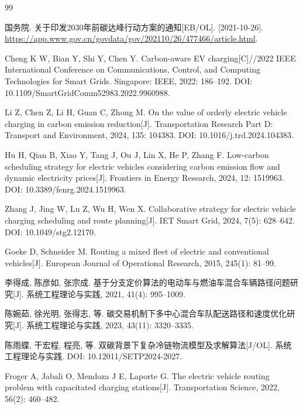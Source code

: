 \documentclass{setp-new}
\begin{document}

\begin{thebibliography}{99}

 国务院. 关于印发2030年前碳达峰行动方案的通知[EB/OL]. [2021-10-26].
\url{https://app.www.gov.cn/govdata/gov/202110/26/477466/article.html}.

 Cheng K W, Bian Y, Shi Y, Chen Y. Carbon-aware EV charging[C]//2022 IEEE International Conference on Communications, Control, and Computing Technologies for Smart Grids. Singapore: IEEE, 2022: 186--192. DOI: 10.1109/SmartGridComm52983.2022.9960988.

 Li Z, Chen Z, Li H, Guan C, Zhong M. On the value of orderly electric vehicle charging in carbon emission reduction[J]. Transportation Research Part D: Transport and Environment, 2024, 135: 104383. DOI: 10.1016/j.trd.2024.104383.

 Hu H, Qian B, Xiao Y, Tang J, Ou J, Lin X, He P, Zhang F. Low-carbon scheduling strategy for electric vehicles considering carbon emission flow and dynamic electricity prices[J]. Frontiers in Energy Research, 2024, 12: 1519963. DOI: 10.3389/fenrg.2024.1519963.

 Zhang J, Jing W, Lu Z, Wu H, Wen X. Collaborative strategy for electric vehicle charging scheduling and route planning[J]. IET Smart Grid, 2024, 7(5): 628--642. DOI: 10.1049/stg2.12170.

 Goeke D, Schneider M. Routing a mixed fleet of electric and conventional vehicles[J]. European Journal of Operational Research, 2015, 245(1): 81--99.

 李得成, 陈彦如, 张宗成. 基于分支定价算法的电动车与燃油车混合车辆路径问题研究[J]. 系统工程理论与实践, 2021, 41(4): 995--1009.

 陈婉茹, 徐光明, 张得志, 等. 碳交易机制下多中心混合车队配送路径和速度优化研究[J]. 系统工程理论与实践, 2023, 43(11): 3320--3335.

 陈雨蝶, 干宏程, 程亮, 等. 双碳背景下复杂冷链物流模型及求解算法[J/OL]. 系统工程理论与实践. DOI: 10.12011/SETP2024-2027.

 Froger A, Jabali O, Mendoza J E, Laporte G. The electric vehicle routing problem with capacitated charging stations[J]. Transportation Science, 2022, 56(2): 460--482.


\end{thebibliography}
\end{document}
